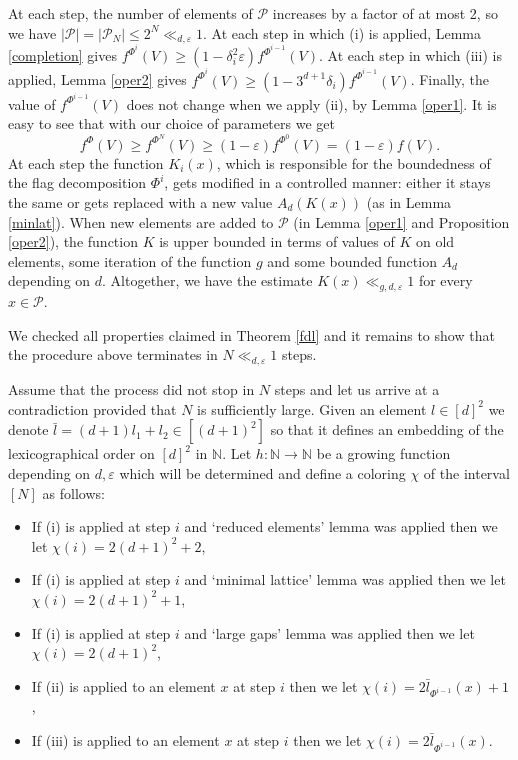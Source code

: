 \documentclass{daj}
\renewcommand{\le}{\leqslant}
\renewcommand{\ge}{\geqslant}
\newcommand{\N}{\mathbb N}
\renewcommand{\P}{\mathcal P}
\theoremstyle{definition}
\theoremstyle{remark}
\theoremstyle{definition}
\theoremstyle{definition}
\begin{document}
At each step, the number of elements of $\P$ increases by a factor of at most 2, so we have $|\P| = |\P_N| \le 2^N \ll_{d, \varepsilon} 1$. At each step in which (i) is applied, Lemma \ref{completion} gives $f^{\Phi^i}(V) \ge (1-\delta_i^2 \varepsilon)f^{\Phi^{i-1}}(V)$. At each step in which (iii) is applied, Lemma \ref{oper2} gives $f^{\Phi^i}(V) \ge (1-3^{d+1}\delta_i)f^{\Phi^{i-1}}(V)$. Finally, the value of $f^{\Phi^{i-1}}(V)$ does not change when we apply (ii), by Lemma \ref{oper1}. It is easy to see that with our choice of parameters we get
$$
f^{\Phi}(V) \ge f^{\Phi^{N}}(V) \ge (1-\varepsilon) f^{\Phi^0}(V) = (1-\varepsilon) f(V).
$$
At each step the function $K_i(x)$, which is responsible for the boundedness of the flag decomposition $\Phi^i$, gets modified in a controlled manner: either it stays the same or gets replaced with a new value $A_d(K(x))$ (as in Lemma \ref{minlat}). When new elements are added to $\P$ (in Lemma \ref{oper1} and Proposition \ref{oper2}), the function $K$ is upper bounded in terms of values of $K$ on old elements, some iteration of the function $g$ and some bounded function $A_d$ depending on $d$. Altogether, we have the estimate $K(x) \ll_{g, d,\varepsilon} 1$ for every $x \in \P$.

We checked all properties claimed in Theorem \ref{fdl} and it remains to show that the procedure above terminates in $N\ll_{d, \varepsilon}1$ steps.

Assume that the process did not stop in $N$ steps and let us arrive at a contradiction provided that $N$ is sufficiently large. Given an element $l \in [d]^2$ we denote $\bar l = (d+1) l_1 + l_2 \in [(d+1)^2]$ so that it defines an embedding of the lexicographical order on $[d]^2$ in $\N$.
Let $h: \N\rightarrow \N$ be a growing function depending on $d, \varepsilon$ which will be determined and define a coloring $\chi$ of the interval $[N]$ as follows:
\begin{itemize}
    \item If (i) is applied at step $i$ and `reduced elements' lemma was applied then we let $\chi(i) = 2(d+1)^2+2$,
    \item If (i) is applied at step $i$ and `minimal lattice' lemma was applied then we let $\chi(i) = 2(d+1)^2+1$,
    \item If (i) is applied at step $i$ and `large gaps' lemma was applied then we let $\chi(i) = 2(d+1)^2$,
    \item If (ii) is applied to an element $x$ at step $i$ then we let $\chi(i) = 2 \bar l_{\Phi^{i-1}}(x) + 1$,
    \item If (iii) is applied to an element $x$ at step $i$ then we let $\chi(i) = 2 \bar l_{\Phi^{i-1}}(x)$.
\end{itemize}
\end{document}

